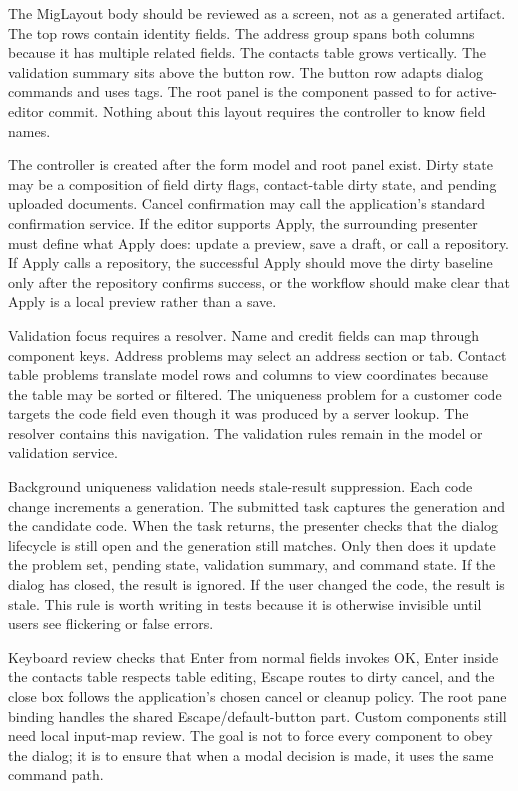 The MigLayout body should be reviewed as a screen, not as a generated artifact.
The top rows contain identity fields. The address group spans both columns
because it has multiple related fields. The contacts table grows vertically.
The validation summary sits above the button row. The button row adapts
dialog commands and uses tags. The root panel is the component passed to
 for active-editor commit. Nothing about this layout requires
the controller to know field names.

The controller is created after the form model and root panel exist. Dirty
state may be a composition of field dirty flags, contact-table dirty state, and
pending uploaded documents. Cancel confirmation may call the application's
standard confirmation service. If the editor supports Apply, the surrounding
presenter must define what Apply does: update a preview, save a draft, or call
a repository. If Apply calls a repository, the successful Apply should move the
dirty baseline only after the repository confirms success, or the workflow
should make clear that Apply is a local preview rather than a save.

Validation focus requires a resolver. Name and credit fields can map through
component keys. Address problems may select an address section or tab. Contact
table problems translate model rows and columns to view coordinates because
the table may be sorted or filtered. The uniqueness problem for a customer code
targets the code field even though it was produced by a server lookup. The
resolver contains this navigation. The validation rules remain in the model or
validation service.

Background uniqueness validation needs stale-result suppression. Each code
change increments a generation. The submitted task captures the generation and
the candidate code. When the task returns, the presenter checks that the
dialog lifecycle is still open and the generation still matches. Only then
does it update the problem set, pending state, validation summary, and command
state. If the dialog has closed, the result is ignored. If the user changed the
code, the result is stale. This rule is worth writing in tests because it is
otherwise invisible until users see flickering or false errors.

Keyboard review checks that Enter from normal fields invokes OK, Enter inside
the contacts table respects table editing, Escape routes to dirty cancel, and
the close box follows the application's chosen cancel or cleanup policy. The
root pane binding handles the shared Escape/default-button part. Custom
components still need local input-map review. The goal is not to force every
component to obey the dialog; it is to ensure that when a modal decision is
made, it uses the same command path.

